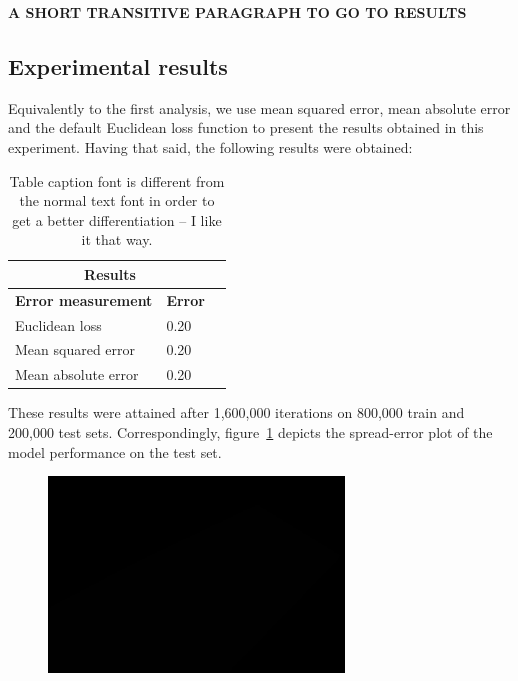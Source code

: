 \textbf{A SHORT TRANSITIVE PARAGRAPH TO GO TO RESULTS}

\subsection{Experimental results}

Equivalently to the first analysis, we use mean squared error, mean absolute error and the default Euclidean loss function to present the results obtained in this experiment. Having that said, the following results were obtained:

\begin{table}[H]
\centering
\small\sffamily
\begin{tabular}{llr}
\multicolumn{2}{c}{\textbf{\textbf{Results}}} \\
\bottomrule
\textbf{Error measurement}        & \textbf{Error} \\
\bottomrule
Euclidean loss           & 0.20  \\
Mean squared error       & 0.20  \\
Mean absolute error      & 0.20  \\
\bottomrule
\end{tabular}
\caption{Table caption font is different from the normal text font in order to get a better differentiation -- I like it that way.}
\label{tab:res}
\end{table} 

These results were attained after 1,600,000 iterations on 800,000 train and 200,000 test sets. Correspondingly, figure~\ref{fig:splot} depicts the spread-error plot of the model performance on the test set.

\begin{figure}[H]
	\centering
	{\includegraphics[width=0.7\textwidth]{images/1}}
	\caption{}
	\label{fig:splot}
\end{figure}

